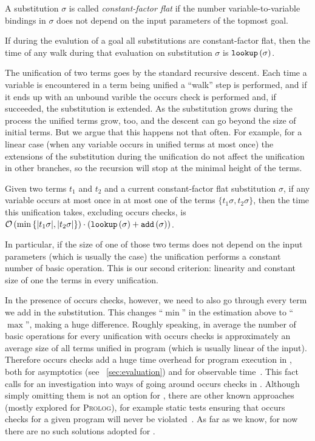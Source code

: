 \begin{definition}
A substitution $\sigma$ is called \emph{constant-factor flat} if the number variable-to-variable bindings in $\sigma$ does not depend on the input parameters of the topmost goal.
\end{definition}

\begin{lemma}
If during the evalution of a goal all substitutions are constant-factor flat, then the time of any walk during that evaluation on substitution $\sigma$ is $\texttt{lookup}\,(\sigma)$.
\end{lemma}

The unification of two terms goes by the standard recursive descent. Each time a variable is encountered in a term being unified a ``walk'' step is performed, and if it ends up with
an unbound varible the occurs check is performed and, if succeeded, the substitution is extended. As the substitution grows during the process  the unified terms grow,
too, and the descent can go beyond the size of initial terms. But we argue that this happens not that often. For example, for a linear case (when any variable occurs in unified terms at
most once) the extensions of the substitution during the unification do not affect the unification in other branches, so the recursion will stop at the minimal height of the terms. 

\begin{lemma}
  Given two terms $t_1$ and $t_2$ and a current constant-factor flat substitution $\sigma$, if any variable occurs at most once in at most one of the terms $\{t_1 \sigma, t_2 \sigma\}$,
  then the time this unification takes, excluding occurs checks, is $\mathcal{O}\,(\min\,\{|t_1 \sigma|, |t_2 \sigma|\}) \cdot (\texttt{lookup}\,(\sigma) + \texttt{add}\,(\sigma))$.
\end{lemma}

In particular, if the size of one of those two terms does not depend on the input parameters (which is usually the case) the unification performs a constant number of basic operation.
This is our second criterion: linearity and constant size of one the terms in every unification.

In the presence of occurs checks, however, we need to also go through every term we add in the substitution. This changes ``$\min$'' in the estimation above to ``$\max$'', making a huge
difference. Roughly speaking, in average the number of basic operations for every unification with occurs checks is approximately an average size of all terms unified in program
(which is usually linear of the input). Therefore occurs checks add a huge time overhead for program execution in \mK, both for asymptotics (see \sectionword~\ref{sec:evaluation})
and for observable time~\cite{WillThesis}. This fact calls for an investigation into ways of going around occurs checks in \mK. Although simply omitting them is not an option for \mK,
there are other known approaches (mostly explored for \textsc{Prolog}), for example static tests ensuring that occurs checks for a given program will never be violated~\cite{OccursCheckStaticTest}.
As far as we know, for now there are no such solutions adopted for \mK.

